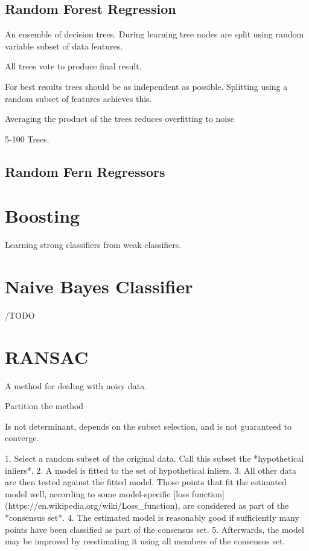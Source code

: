 {{{{{{\subsection{Random Forest Regression}

An ensemble of decision trees. During learning tree nodes are split using random variable subset of data features.

All trees vote to produce final result.

For best results trees should be as independent as possible. Splitting using a random subset of features achieves this.

Averaging the product of the trees reduces overfitting to noise

5-100 Trees.

\subsection{Random Fern Regressors}



\section{Boosting}
Learning strong classifiers from weak classifiers.





\section{Naive Bayes Classifier}

/TODO

\section{RANSAC}

A method for dealing with noisy data. 

Partition the method 

Is not determinant, depends on the subset selection, and is not guaranteed to converge.

1. Select a random subset of the original data. Call this subset the *hypothetical inliers*.
2. A model is fitted to the set of hypothetical inliers.
3. All other data are then tested against the fitted model. Those points that fit the estimated model well, according to some model-specific [loss function](https://en.wikipedia.org/wiki/Loss_function), are considered as part of the *consensus set*.
4. The estimated model is reasonably good if sufficiently many points have been classified as part of the consensus set.
5. Afterwards, the model may be improved by reestimating it using all members of the consensus set.

}}}}}}
